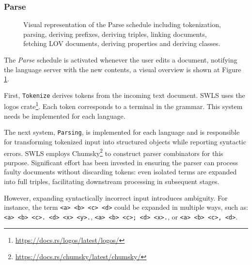 \subsubsection{Parse}

\begin{figure}[tb]
 \centering
  \caption{Visual representation of the Parse schedule including tokenization, parsing, deriving prefixes, deriving triples, linking documents, fetching LOV documents, deriving properties and deriving classes. }\label{fig:Parse}
\end{figure}

The \textit{Parse} schedule is activated whenever the user edits a document, notifying the language server with the new contents, a visual overview is shown at Figure \ref{fig:Parse}.

First, \texttt{Tokenize} derives tokens from the incoming text document. SWLS uses the logos crate\footnote{\url{https://docs.rs/logos/latest/logos/}}. 
Each token corresponds to a terminal in the grammar. This system needs be implemented for each language.

The next system, \texttt{Parsing}, is implemented for each language and is responsible for transforming tokenized input into structured objects while reporting syntactic errors. 
SWLS employs Chumsky\footnote{\url{https://docs.rs/chumsky/latest/chumsky/}} to construct parser combinators for this purpose.
Significant effort has been invested in ensuring the parser can process faulty documents without discarding tokens: even isolated terms are expanded into full triples, facilitating downstream processing in subsequent stages.

However, expanding syntactically incorrect input introduces ambiguity.
For instance, the term \texttt{<a> <b> <c> <d>} could be expanded in multiple ways, such as: \texttt{<a> <b> <c>. <d> <x> <y>.}, \texttt{<a> <b> <c>; <d> <x>.}, or \texttt{<a> <b> <c>, <d>}.


